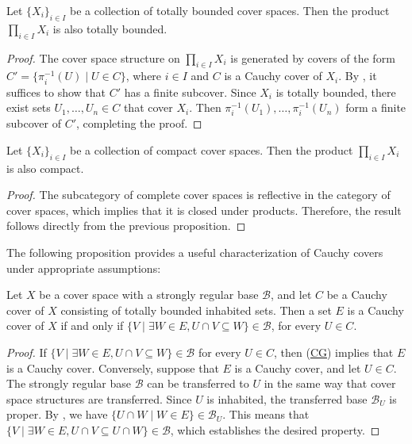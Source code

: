 \documentclass[reqno]{amsart}
\newcommand{\axref}[1]{(\hyperref[ax:#1]{#1})}
\theoremstyle{definition}
\theoremstyle{remark}
\numberwithin{figure}{section}
\begin{document}
\begin{prop}
Let $\{ X_i \}_{i \in I}$ be a collection of totally bounded cover spaces.
Then the product $\prod_{i \in I} X_i$ is also totally bounded.
\end{prop}
\begin{proof}
The cover space structure on $\prod_{i \in I} X_i$ is generated by covers of the form $C' = \{ \pi_i^{-1}(U) \mid U \in C \}$, where  $i \in I$ and $C$ is a Cauchy cover of $X_i$.
By , it suffices to show that $C'$ has a finite subcover.
Since $X_i$ is totally bounded, there exist sets $U_1, \ldots, U_n \in C$ that cover $X_i$.
Then $\pi_i^{-1}(U_1), \ldots, \pi_i^{-1}(U_n)$ form a finite subcover of $C'$, completing the proof.
\end{proof}

\begin{cor}
Let $\{ X_i \}_{i \in I}$ be a collection of compact cover spaces.
Then the product $\prod_{i \in I} X_i$ is also compact.
\end{cor}
\begin{proof}
The subcategory of complete cover spaces is reflective in the category of cover spaces, which implies that it is closed under products.
Therefore, the result follows directly from the previous proposition.
\end{proof}

The following proposition provides a useful characterization of Cauchy covers under appropriate assumptions:

\begin{prop}
Let $X$ be a cover space with a strongly regular base $\mathcal{B}$, and let $C$ be a Cauchy cover of $X$ consisting of totally bounded inhabited sets.
Then a set $E$ is a Cauchy cover of $X$ if and only if $\{ V \mid \exists W \in E, U \cap V \subseteq W \} \in \mathcal{B}$, for every $U \in C$.
\end{prop}
\begin{proof}
If $\{ V \mid \exists W \in E, U \cap V \subseteq W \} \in \mathcal{B}$ for every $U \in C$, then \axref{CG} implies that $E$ is a Cauchy cover.
Conversely, suppose that $E$ is a Cauchy cover, and let $U \in C$.
The strongly regular base $\mathcal{B}$ can be transferred to $U$ in the same way that cover space structures are transferred.
Since $U$ is inhabited, the transferred base $\mathcal{B}_U$ is proper.
By , we have $\{ U \cap W \mid W \in E \} \in \mathcal{B}_U$.
This means that $\{ V \mid \exists W \in E, U \cap V \subseteq U \cap W \} \in \mathcal{B}$, which establishes the desired property.
\end{proof}
\end{document}
